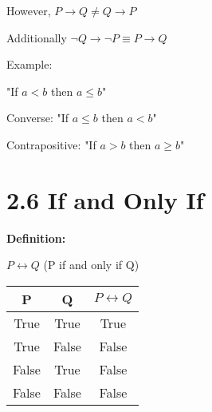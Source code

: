 \documentclass[11pt]{article}
\begin{document}
However, $P \rightarrow Q \neq Q \rightarrow P$

Additionally $\neg Q \rightarrow \neg P \equiv P \rightarrow Q$

\medskip
Example:

"If $a < b$ then $a \leq b$"

Converse: "If $a \leq b$ then $a < b$"

Contrapositive: "If $a > b$ then $a \geq b$"

\section*{2.6 If and Only If}

\textbf{Definition: }

$P \leftrightarrow Q$ (P if and only if Q)

\medskip

\begin{center}
    \begin{tabular}{ |c|c|c| } 
        \hline
        P & Q & $P \leftrightarrow Q$ \\ 
        \hline
        True & True & True \\ 
        True & False & False \\
        False & True & False \\
        False & False & False \\ 
        \hline
    \end{tabular}
\end{center}
\end{document}
